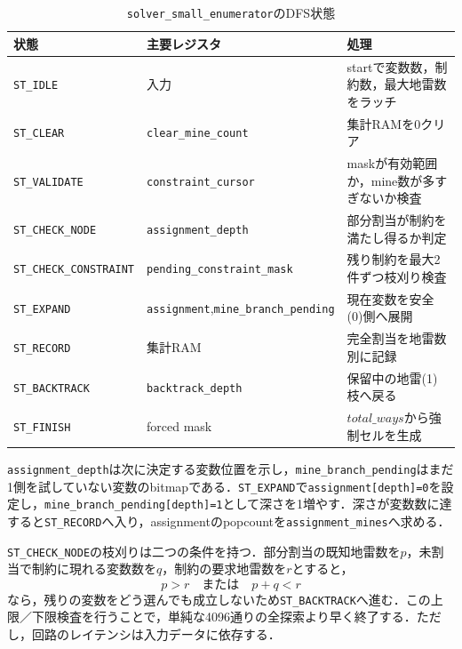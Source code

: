 \begin{table}[tb]
\centering
\caption{\texttt{solver\_small\_enumerator}のDFS状態}
\label{tab:enumerator-states}
\begin{tabularx}{\linewidth}{llX}
\toprule
状態 & 主要レジスタ & 処理\\
\midrule
\texttt{ST\_IDLE} & 入力 & startで変数数，制約数，最大地雷数をラッチ\\
\texttt{ST\_CLEAR} & \texttt{clear\_mine\_count} & 集計RAMを0クリア\\
\texttt{ST\_VALIDATE} & \texttt{constraint\_cursor} & maskが有効範囲か，mine数が多すぎないか検査\\
\texttt{ST\_CHECK\_NODE} & \texttt{assignment\_depth} & 部分割当が制約を満たし得るか判定\\
\texttt{ST\_CHECK\_CONSTRAINT} & \texttt{pending\_constraint\_mask} & 残り制約を最大2件ずつ枝刈り検査\\
\texttt{ST\_EXPAND} & \texttt{assignment},\texttt{mine\_branch\_pending} & 現在変数を安全(0)側へ展開\\
\texttt{ST\_RECORD} & 集計RAM & 完全割当を地雷数別に記録\\
\texttt{ST\_BACKTRACK} & \texttt{backtrack\_depth} & 保留中の地雷(1)枝へ戻る\\
\texttt{ST\_FINISH} & forced mask & $total\_ways$から強制セルを生成\\
\bottomrule
\end{tabularx}
\end{table}

\texttt{assignment\_depth}は次に決定する変数位置を示し，\texttt{mine\_branch\_pending}はまだ1側を試していない変数のbitmapである．\texttt{ST\_EXPAND}で\texttt{assignment[depth]=0}を設定し，\texttt{mine\_branch\_pending[depth]=1}として深さを1増やす．深さが変数数に達すると\texttt{ST\_RECORD}へ入り，assignmentのpopcountを\texttt{assignment\_mines}へ求める．

\texttt{ST\_CHECK\_NODE}の枝刈りは二つの条件を持つ．部分割当の既知地雷数を$p$，未割当で制約に現れる変数数を$q$，制約の要求地雷数を$r$とすると，
\begin{equation}
  p>r\quad\text{または}\quad p+q<r
  \label{eq:enumerator-prune}
\end{equation}
なら，残りの変数をどう選んでも成立しないため\texttt{ST\_BACKTRACK}へ進む．この上限／下限検査を行うことで，単純な4096通りの全探索より早く終了する．ただし，回路のレイテンシは入力データに依存する．

